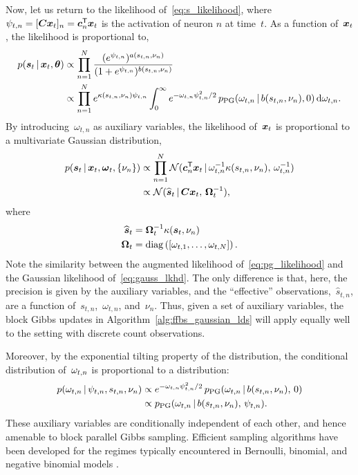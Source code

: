 Now, let us return to the likelihood of~\eqref{eq:s_likelihood},
where~${\psi_{t,n} = [\boldsymbol{C} \boldsymbol{x}_t]_n = \boldsymbol{c}_n^{\mathsf{T}} \boldsymbol{x}_t}$ is the activation of neuron $n$
at time~$t$. As a function of~$\boldsymbol{x}_t$, the likelihood is proportional to,
\begin{align*}
  p(\boldsymbol{s}_t \,|\, \boldsymbol{x}_t, \boldsymbol{\theta})
  &\propto \prod_{n=1}^N 
  \frac{(e^{\psi_{t,n}})^{a(s_{t,n}, \nu_n)}}
       {(1+e^{\psi_{t,n}})^{b(s_{t,n}, \nu_n)}} \\
  &\propto \prod_{n=1}^N 
     e^{\kappa(s_{t,n}, \nu_n) \psi_{t,n}}
  \int_{0}^{\infty} e^{-{\omega}_{t,n} \psi_{t,n}^2 /2} \,
  p_{\mathrm{PG}}({\omega}_{t,n} \,|\, b(s_{t,n}, \nu_n), 0) \,
  \mathrm{d}{\omega}_{t,n}.
\end{align*}
By introducing~$\omega_{t,n}$ as auxiliary variables,
the likelihood of~$\boldsymbol{x}_t$ is proportional to a multivariate Gaussian
distribution,
\begin{align}
  \nonumber
  p(\boldsymbol{s}_t \,|\, \boldsymbol{x}_t, \boldsymbol{\omega}_t, \{\nu_n\})
  &\propto \prod_{n=1}^N
  \mathcal{N}(\boldsymbol{c}_n^{\mathsf{T}} \boldsymbol{x}_t \,|\,
  \omega_{t,n}^{-1} \kappa(s_{t,n}, \nu_n), \,
  \omega_{t,n}^{-1}) \\
  \label{eq:pg_likelihood}
  &\propto \mathcal{N}(
  \widehat{\boldsymbol{s}}_t \,|\,
  \boldsymbol{C} \boldsymbol{x}_t, \, 
  \boldsymbol{\Omega}_t^{-1}),
\end{align}
where
\begin{align*}
  \widehat{\boldsymbol{s}}_t &= \boldsymbol{\Omega}_t^{-1} \kappa(\boldsymbol{s}_t, \nu_n) \\
  \boldsymbol{\Omega}_t &= \mathrm{diag} \left( \left[ \omega_{t,1}, \ldots, \omega_{t,N} \right] \right).
\end{align*}
Note the similarity between the augmented likelihood
of~\eqref{eq:pg_likelihood} and the Gaussian likelihood
of~\eqref{eq:gauss_lkhd}. The only difference is that, here, the
precision is given by the auxiliary variables, and the ``effective''
observations,~$\widehat{s}_{t,n}$, are a function 
of~$s_{t,n}$,~$\omega_{t,n}$, and~$\nu_n$.  Thus, given a set of
\polyagamma auxiliary variables, the block Gibbs updates in
Algorithm~\ref{alg:ffbs_gaussian_lds} will apply equally well to the
setting with discrete count observations.

Moreover, by the exponential tilting property of the \polyagamma
distribution, the conditional distribution of~${\omega}_{t,n}$
is proportional to a \polyagamma distribution:
\begin{align}
  \nonumber
  p({\omega}_{t,n} \,|\, \psi_{t,n}, s_{t,n}, \nu_n) &
  \propto e^{-{\omega}_{t,n} \psi_{t,n}^2/2} \,
  p_{\mathrm{PG}}({\omega}_{t,n} \,|\, b(s_{t,n}, \nu_n), \, 0) \\
  \label{eq:omega_conditional}
  &\propto p_{\mathrm{PG}}({\omega}_{t,n} \,|\, b(s_{t,n}, \nu_n), \, \psi_{t,n}).
\end{align}
These auxiliary variables are conditionally independent of each other,
and hence amenable to block parallel Gibbs sampling.  Efficient
\polyagamma sampling algorithms have been developed for the regimes
typically encountered in Bernoulli, binomial, and negative binomial
models \citep{windle2014sampling}.

